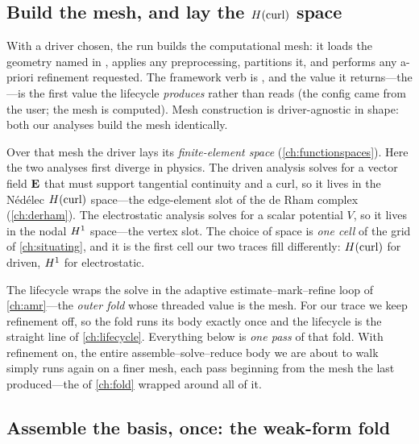 \subsection{Build the mesh, and lay the \texorpdfstring{$H(\mathrm{curl})$}{H(curl)} space}
\label{sec:trace-mesh}

With a driver chosen, the run builds the computational mesh: it loads the geometry
named in , applies any preprocessing, partitions it, and performs any
a-priori refinement requested. The framework verb is , and the
value it returns---the ---is the first value the lifecycle
\emph{produces} rather than reads (the config came from the user; the mesh is
computed). Mesh construction is driver-agnostic in shape: both our analyses build
the mesh identically.

Over that mesh the driver lays its \emph{finite-element space} (\cref{ch:functionspaces}).
Here the two analyses first diverge in physics. The driven analysis solves for a
vector field $\mathbf{E}$ that must support tangential continuity and a curl, so it lives
in the Nédélec $H(\mathrm{curl})$ space---the edge-element slot of the de Rham complex
(\cref{ch:derham}). The electrostatic analysis solves for a scalar potential $V$,
so it lives in the nodal $H^1$ space---the vertex slot. The choice of space is
\emph{one cell} of the grid of \cref{ch:situating}, and it is the first cell our
two traces fill differently: $H(\mathrm{curl})$ for driven, $H^1$ for electrostatic.

\begin{remark}
The lifecycle wraps the solve in the adaptive estimate--mark--refine loop of
\cref{ch:amr}---the \emph{outer fold} whose threaded value is the mesh. For our
trace we keep refinement off, so the fold runs its body exactly once and the
lifecycle is the straight line of \cref{ch:lifecycle}. Everything below is
\emph{one pass} of that fold. With refinement on, the entire
assemble--solve--reduce body we are about to walk simply runs again on a finer
mesh, each pass beginning from the mesh the last produced---the
 of \cref{ch:fold} wrapped around all of it.
\end{remark}

\subsection{Assemble the basis, once: the weak-form fold}
\label{sec:trace-assemble}

